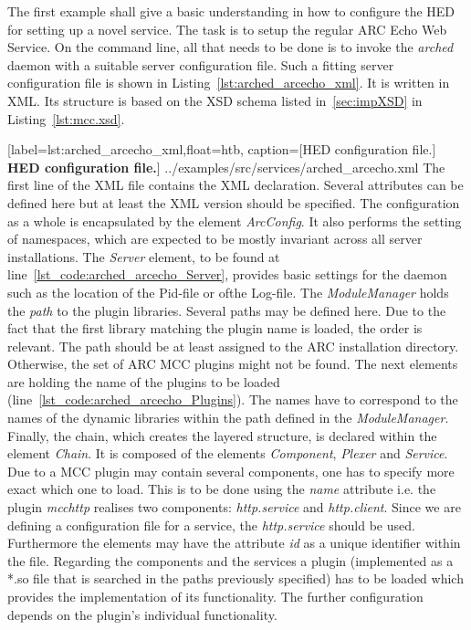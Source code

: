 The first example shall give a basic understanding in how to configure the HED for setting up a novel service.
The task is to setup the regular ARC Echo Web Service.
On the command line, all that needs to be done is to invoke the \textit{arched} daemon with a suitable server configuration file.
Such a fitting server configuration file is shown in Listing~\ref{lst:arched_arcecho_xml}.
It is written in XML. Its structure is based on the XSD schema listed in~\ref{sec:impXSD} in Listing~\ref{lst:mcc.xsd}.\\ 


	[label=lst:arched_arcecho_xml,float=htb,
	caption={[HED configuration file.]
	\textbf{HED configuration file.}}]
{../examples/src/services/arched_arcecho.xml}
The first line of the XML file contains the XML declaration.
Several attributes can be defined here but at least the XML version should be specified.
The configuration as a whole is encapsulated by the element \textit{ArcConfig}. It also performs the setting of namespaces, which are expected to be mostly invariant across all server installations. %
The \textit{Server} element, to be found at line~\ref{lst_code:arched_arcecho_Server}, provides basic settings for the daemon such as the location of the Pid-file or ofthe Log-file.
The \textit{ModuleManager} holds the \textit{path} to the plugin libraries.
Several paths may be defined here.
Due to the fact that the first library matching the plugin name is loaded, the order is relevant.
The path should be at least assigned to the ARC installation directory.
Otherwise, the set of ARC MCC plugins might not be found.
The next elements are holding the name of the plugins to be loaded (line~\ref{lst_code:arched_arcecho_Plugins}).
The names have to correspond to the names of the dynamic libraries within the path defined in the \textit{ModuleManager}.
Finally, the chain, which creates the layered structure, is declared within the element \textit{Chain}.
It is composed of the elements \textit{Component}, \textit{Plexer} and \textit{Service}.
Due to a MCC plugin may contain several components, one has to specify more exact which one to load. This is to be done using the \textit{name} attribute i.e. the plugin \textit{mcchttp} realises two components: \textit{http.service} and \textit{http.client}. Since we are defining a configuration file for a service, the \textit{http.service} should be used.
Furthermore the elements may have the attribute \textit{id} as a unique identifier within the file.
Regarding the components and the services a plugin (implemented as a *.so file that is searched in the paths previously specified) has to be loaded which provides the implementation of its functionality. The further configuration depends on the plugin's individual functionality.\\
%
%


